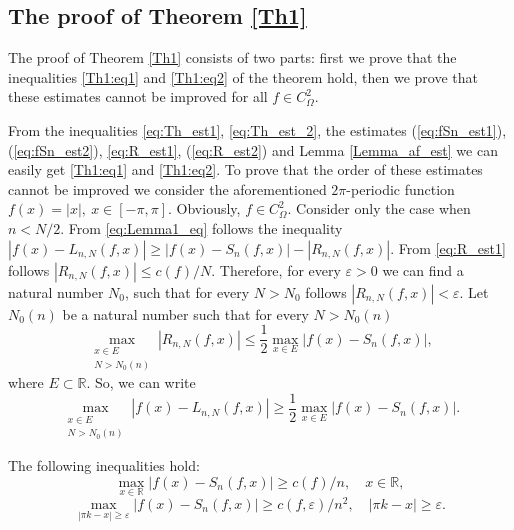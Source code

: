\subsection{The proof of Theorem \ref{Th1}}
The proof of Theorem \ref{Th1} consists of two parts: first we prove that the inequalities \eqref{Th1:eq1} and \eqref{Th1:eq2} of the theorem hold, then we prove that
these estimates cannot be improved for all $f \in C_{\Omega}^{2}$. 	

From the inequalities \eqref{eq:Th_est1}, \eqref{eq:Th_est_2}, the estimates
(\ref{eq:fSn_est1}), (\ref{eq:fSn_est2}), %
\eqref{eq:R_est1}, (\ref{eq:R_est2}) %
and Lemma \ref{Lemma_af_est} we can easily get \eqref{Th1:eq1} and \eqref{Th1:eq2}.
To prove that the order of these estimates cannot be improved we consider the aforementioned $2\pi$-periodic function 
$f(x) = |x|,\ x \in [-\pi,\pi]$. Obviously, $f \in C_{\Omega}^{2}$. 
Consider only the case when $n < N/2$.	
From \eqref{eq:Lemma1_eq} follows the inequality
$
\left|f(x) - L_{n,N}(f,x)\right| \geq \left|f(x) - S_n(f,x)\right| - \left|R_{n,N}(f,x)\right|.
$
From \eqref{eq:R_est1} follows $\left|R_{n,N}(f,x)\right| \leq c(f)/N$. Therefore, for every $\varepsilon > 0$
we can find a natural number $N_0$, such that for every $N > N_0$ follows $\left|R_{n,N}(f,x)\right| < \varepsilon$. 
Let $N_0(n)$ be a natural number such that for every $N > N_0(n)$  
$$
\max_{\substack{x \in E \\ N > N_0(n)}} \left|R_{n,N}(f,x)\right| \leq \frac12 \max_{x \in E} \left|f(x) - S_{n}(f,x)\right|,
$$
where $E \subset \mathbb{R}$.
So, we can write
\begin{equation} \label{maxLgeqmaxRn}
\max_{\substack{x \in E \\ N > N_0(n)}}\left|f(x) - L_{n,N}(f,x)\right| \geq \frac12 \max_{x \in E}\left|f(x) - S_n(f,x)\right|.
\end{equation}
\begin{lemma}
	The following inequalities hold:
	$$
	\max_{x \in \mathbb{R}}\left|f(x) - S_n(f,x)\right| \geq {c(f)}/{n},\quad x \in \mathbb{R},
	$$
	$$
	\max_{\left|\pi k - x\right| \geq \varepsilon} \left|f(x) - S_n(f,x)\right| \geq {c(f, \varepsilon)}/{n^2},\quad \left|\pi k - x\right| \geq \varepsilon.
	$$
\end{lemma}
